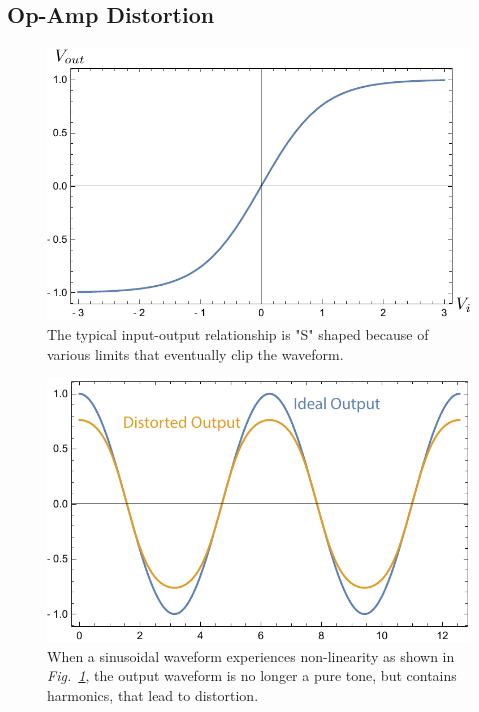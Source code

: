 \subsection{Op-Amp Distortion}
\begin{figure}[tb]
\centering
\includegraphics[width=.75\columnwidth]{vtanh}
\caption{The typical input-output relationship is "S" shaped because of various limits that eventually clip the waveform.}
\label{fig:vtanh}
\end{figure}
\begin{figure}[tb]
\centering
\includegraphics[width=.75\columnwidth]{vdisto}
\caption{When a sinusoidal waveform experiences non-linearity as shown in \emph{Fig.~\ref{fig:vtanh}}, the output waveform is no longer a pure tone, but contains harmonics, that lead to distortion.}
\label{fig:vdisto}
\end{figure}
